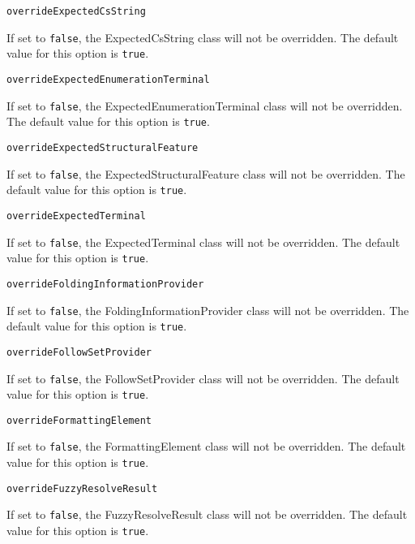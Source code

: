 \noindent\texttt{overrideExpectedCsString}
\begin{myindentpar}{1cm}
If set to \texttt{false}, the ExpectedCsString class will not be overridden. The default value for this option is \texttt{true}.
\end{myindentpar}

\noindent\texttt{overrideExpectedEnumerationTerminal}
\begin{myindentpar}{1cm}
If set to \texttt{false}, the ExpectedEnumerationTerminal class will not be overridden. The default value for this option is \texttt{true}.
\end{myindentpar}

\noindent\texttt{overrideExpectedStructuralFeature}
\begin{myindentpar}{1cm}
If set to \texttt{false}, the ExpectedStructuralFeature class will not be overridden. The default value for this option is \texttt{true}.
\end{myindentpar}

\noindent\texttt{overrideExpectedTerminal}
\begin{myindentpar}{1cm}
If set to \texttt{false}, the ExpectedTerminal class will not be overridden. The default value for this option is \texttt{true}.
\end{myindentpar}

\noindent\texttt{overrideFoldingInformationProvider}
\begin{myindentpar}{1cm}
If set to \texttt{false}, the FoldingInformationProvider class will not be overridden. The default value for this option is \texttt{true}.
\end{myindentpar}

\noindent\texttt{overrideFollowSetProvider}
\begin{myindentpar}{1cm}
If set to \texttt{false}, the FollowSetProvider class will not be overridden. The default value for this option is \texttt{true}.
\end{myindentpar}

\noindent\texttt{overrideFormattingElement}
\begin{myindentpar}{1cm}
If set to \texttt{false}, the FormattingElement class will not be overridden. The default value for this option is \texttt{true}.
\end{myindentpar}

\noindent\texttt{overrideFuzzyResolveResult}
\begin{myindentpar}{1cm}
If set to \texttt{false}, the FuzzyResolveResult class will not be overridden. The default value for this option is \texttt{true}.
\end{myindentpar}

